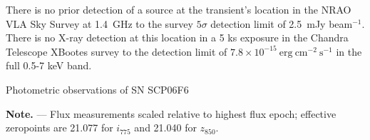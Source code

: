 There is no prior detection of a source at the transient's location in
the NRAO VLA Sky Survey \citep{condon98a} at 1.4~GHz to the survey
$5\sigma$ detection limit of 2.5~mJy beam$^{-1}$.  There is no X-ray
detection at this location in a 5 ks exposure in the Chandra Telescope
XBootes survey \citep{kenter05a} to the detection limit of $7.8 \times
10^{-15}~\mathrm{erg}~ \mathrm{cm}^{-2}~\mathrm{s}^{-1}$ in the full
0.5-7 keV band.

\begin{table}[tbh]
\begin{center}
\caption{Photometric observations of SN SCP06F6\label{tab:lightcurve}}
\vspace{10pt}

\end{center}
{\footnotesize
{\bf Note.} --- Flux measurements scaled relative to highest flux
epoch; effective zeropoints are 21.077 for $i_{775}$ and 21.040 for
$z_{850}$.
}
\end{table}


